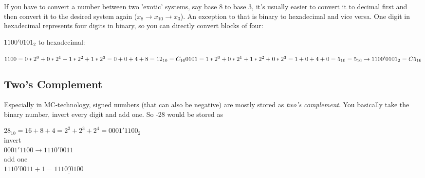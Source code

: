 \documentclass[a4paper, 11pt, nofootinbib]{book}
\begin{document}
\noindent If you have to convert a number between two 'exotic' systems, say base 8 to base 3, it's usually easier to convert it to decimal first and then convert it to the desired system again ($x_{8} \rightarrow x_{10} \rightarrow x_{3}$). An exception to that is binary to hexadecimal and vice versa. One digit in hexadecimal represents four digits in binary, so you can directly convert blocks of four:

\noindent $1100'0101_{2}$ to hexadecimal:
\vspace{10px}

\noindent
$1100 = 0*2^0 + 0* 2^1 + 1*2^2 + 1*2^3 = 0 + 0 + 4 + 8 = 12_{10} = C_{16} \\
0101 = 1 * 2^0 + 0*2^1  + 1*2^2 + 0*2^3 = 1 + 0 + 4 + 0 = 5_{10} = 5_{16} \\
\rightarrow 1100'0101_{2} = C5_{16}
$

\subsection{Two's Complement}
Especially in MC-technology, signed numbers (that can also be negative) are mostly stored as \textit{two's complement}. You basically take the binary number, invert every digit and add one. So -28 would be stored as
\vspace{10px}

\noindent
$ 28_{10} = 16 + 8 + 4 = 2^2 + 2^3 + 2^4 = 0001'1100_{2}$ \\
invert \\
$ 0001'1100 \rightarrow 1110'0011$\\
add one \\
$1110'0011 + 1 = \underline{\underline{1110'0100}}$
\end{document}
